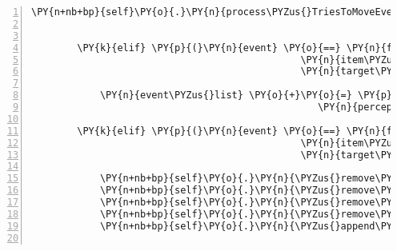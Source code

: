 \begin{Verbatim}[commandchars=\\\{\},numbers=left,firstnumber=1,stepnumber=1]
            \PY{n+nb+bp}{self}\PY{o}{.}\PY{n}{process\PYZus{}TriesToMoveEvent}\PY{p}{(}\PY{n}{fabula}\PY{o}{.}\PY{n}{TriesToMoveEvent}\PY{p}{(}\PY{n}{identifier}\PY{o}{=}\PY{l+s}{\PYZsq{}}\PY{l+s}{spider}\PY{l+s}{\PYZsq{}}\PY{p}{,}
                                                                  \PY{n}{target\PYZus{}identifier}\PY{o}{=}\PY{p}{(}\PY{l+m+mi}{0}\PY{p}{,} \PY{l+m+mi}{4}\PY{p}{)}\PY{p}{)}\PY{p}{)}

        \PY{k}{elif} \PY{p}{(}\PY{n}{event} \PY{o}{==} \PY{n}{fabula}\PY{o}{.}\PY{n}{TriesToDropEvent}\PY{p}{(}\PY{n}{identifier}\PY{o}{=}\PY{n}{ID\PYZus{}KUNI}\PY{p}{,}
                                               \PY{n}{item\PYZus{}identifier}\PY{o}{=}\PY{l+s}{\PYZsq{}}\PY{l+s}{cobweb}\PY{l+s}{\PYZsq{}}\PY{p}{,}
                                               \PY{n}{target\PYZus{}identifier}\PY{o}{=}\PY{l+s}{\PYZsq{}}\PY{l+s}{door\PYZus{}unlocked}\PY{l+s}{\PYZsq{}}\PY{p}{)}\PY{p}{)}\PY{p}{:}

            \PY{n}{event\PYZus{}list} \PY{o}{+}\PY{o}{=} \PY{p}{[}\PY{n}{fabula}\PY{o}{.}\PY{n}{PerceptionEvent}\PY{p}{(}\PY{n}{identifier}\PY{o}{=}\PY{n}{ID\PYZus{}KUNI}\PY{p}{,}
                                                  \PY{n}{perception}\PY{o}{=}\PY{l+s}{\PYZsq{}}\PY{l+s}{Warum soll ich mir denn meinen eigenen Weg zu kleben?}\PY{l+s}{\PYZsq{}}\PY{p}{)}\PY{p}{]}

        \PY{k}{elif} \PY{p}{(}\PY{n}{event} \PY{o}{==} \PY{n}{fabula}\PY{o}{.}\PY{n}{TriesToDropEvent}\PY{p}{(}\PY{n}{identifier}\PY{o}{=}\PY{n}{ID\PYZus{}KUNI}\PY{p}{,}
                                               \PY{n}{item\PYZus{}identifier}\PY{o}{=}\PY{l+s}{\PYZsq{}}\PY{l+s}{cobweb}\PY{l+s}{\PYZsq{}}\PY{p}{,}
                                               \PY{n}{target\PYZus{}identifier}\PY{o}{=}\PY{n}{ID\PYZus{}CASSANDRA}\PY{p}{)}\PY{p}{)}\PY{p}{:}

            \PY{n+nb+bp}{self}\PY{o}{.}\PY{n}{\PYZus{}remove\PYZus{}sentence}\PY{p}{(}\PY{n}{ID\PYZus{}CASSANDRA}\PY{p}{,} \PY{l+s}{\PYZsq{}}\PY{l+s}{Laut dem Schild an der Brücke ist das Überfliegen erlaubt!}\PY{l+s}{\PYZsq{}}\PY{p}{)}
            \PY{n+nb+bp}{self}\PY{o}{.}\PY{n}{\PYZus{}remove\PYZus{}sentence}\PY{p}{(}\PY{n}{ID\PYZus{}KUNI}\PY{p}{,} \PY{l+s}{\PYZsq{}}\PY{l+s}{Auf dem Schild an der Brücke steht Überfliegen erlaubt!}\PY{l+s}{\PYZsq{}}\PY{p}{)}
            \PY{n+nb+bp}{self}\PY{o}{.}\PY{n}{\PYZus{}remove\PYZus{}sentence}\PY{p}{(}\PY{n}{ID\PYZus{}KUNI}\PY{p}{,} \PY{l+s}{\PYZsq{}}\PY{l+s}{Ich habe einen sehr klebrigen Spinnweb dabei.}\PY{l+s}{\PYZsq{}}\PY{p}{)}
            \PY{n+nb+bp}{self}\PY{o}{.}\PY{n}{\PYZus{}remove\PYZus{}sentence}\PY{p}{(}\PY{n}{ID\PYZus{}CASSANDRA}\PY{p}{,} \PY{l+s}{\PYZsq{}}\PY{l+s}{Ich habe einen sehr feinen klebrigen Spinnweb dabei.}\PY{l+s}{\PYZsq{}}\PY{p}{)}
            \PY{n+nb+bp}{self}\PY{o}{.}\PY{n}{\PYZus{}append\PYZus{}sentence}\PY{p}{(}\PY{n}{ID\PYZus{}KUNI}\PY{p}{,} \PY{l+s}{\PYZsq{}}\PY{l+s}{Deine Flügel sind ganz, du kannst wieder fliegen!}\PY{l+s}{\PYZsq{}}\PY{p}{)}


\end{Verbatim}
